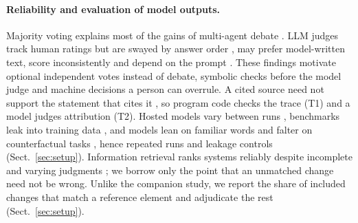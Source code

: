 \paragraph{Reliability and evaluation of model outputs.}
Majority voting explains most of the gains of multi-agent debate \cite{du2024debate,choi2025debate,smit2024mad}.
\ac{LLM} judges track human ratings \cite{liu2023geval,zheng2023judge} but are swayed by answer order
\cite{zheng2023judge,wang2024fair}, may prefer model-written text, score inconsistently
\cite{liu2023geval,stureborg2024inconsistent} and depend on the prompt \cite{yuan2024batcheval}.
These findings motivate optional independent votes instead of debate, symbolic checks before the model judge and %
machine decisions a person can overrule.
A cited source need not support the statement that cites it \cite{rashkin2023ais,gao2023alce}, so program code checks
the trace (T1) and a model judges attribution (T2).
Hosted models vary between runs \cite{atil2025nondeterminism,ouyang2025nondeterminism}, benchmarks leak into training
data \cite{sainz2023contamination}, and models lean on familiar words \cite{mai2024adapt} and falter on counterfactual
tasks \cite{wu2024reciting}, hence repeated runs and leakage controls (Sect.~\ref{sec:setup}).
Information retrieval ranks systems reliably despite incomplete and varying judgments
\cite{zobel1998reliable,voorhees2000variations,buckley2004incomplete}; we borrow only the point that an unmatched
change need not be wrong.
Unlike the companion study, we report the share of included changes that match a reference element and adjudicate
the rest (Sect.~\ref{sec:setup}).
